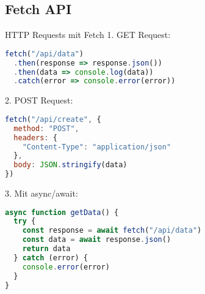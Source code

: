 \subsection{Fetch API}

\begin{KR}{HTTP Requests mit Fetch}
1. GET Request:
\begin{lstlisting}[language=JavaScript, style=basesmol]
fetch("/api/data")
  .then(response => response.json())
  .then(data => console.log(data))
  .catch(error => console.error(error))
\end{lstlisting}

2. POST Request:
\begin{lstlisting}[language=JavaScript, style=basesmol]
fetch("/api/create", {
  method: "POST",
  headers: {
    "Content-Type": "application/json"
  },
  body: JSON.stringify(data)
})
\end{lstlisting}

3. Mit async/await:
\begin{lstlisting}[language=JavaScript, style=basesmol]
async function getData() {
  try {
    const response = await fetch("/api/data")
    const data = await response.json()
    return data
  } catch (error) {
    console.error(error)
  }
}
\end{lstlisting}
\end{KR}